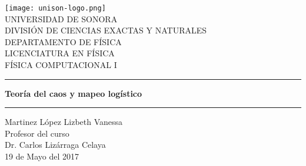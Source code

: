 \documentclass[12pt]{article}
\begin{document}
\begin{center}
\texttt{[image: unison-logo.png]}
\\
\vspace{0.5cm}
UNIVERSIDAD DE SONORA \\
\vspace{0.5cm}
DIVISIÓN DE CIENCIAS EXACTAS Y NATURALES \\
\vspace{0.5cm}
DEPARTAMENTO DE FÍSICA\\
\vspace{0.5cm}
LICENCIATURA EN FÍSICA\\
\vspace{0.5cm}
FÍSICA COMPUTACIONAL I

\vspace{2 cm}
\hrule
\vspace{1 cm}

{\huge \bfseries {Teoría del caos y mapeo logístico}}

\vspace{1 cm}
\hrule
\vspace{2 cm}
Martinez López Lizbeth Vanessa \\ 
\vspace{1 cm}
Profesor del curso\\
Dr. Carlos Lizárraga Celaya\\
\vspace{2 cm}
19 de Mayo del 2017
\end{center}
\pagebreak
\end{document}
